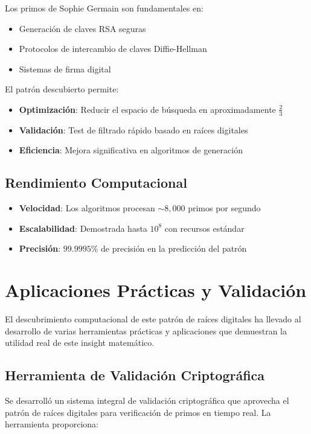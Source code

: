 \documentclass[11pt,a4paper]{article}
\theoremstyle{definition}
\theoremstyle{remark}
\begin{document}
Los primos de Sophie Germain son fundamentales en:
\begin{itemize}
    \item Generación de claves RSA seguras
    \item Protocolos de intercambio de claves Diffie-Hellman
    \item Sistemas de firma digital
\end{itemize}

El patrón descubierto permite:
\begin{itemize}
    \item \textbf{Optimización}: Reducir el espacio de búsqueda en aproximadamente $\frac{2}{3}$
    \item \textbf{Validación}: Test de filtrado rápido basado en raíces digitales
    \item \textbf{Eficiencia}: Mejora significativa en algoritmos de generación
\end{itemize}

\subsection{Rendimiento Computacional}

\begin{itemize}
    \item \textbf{Velocidad}: Los algoritmos procesan $\sim 8,000$ primos por segundo
    \item \textbf{Escalabilidad}: Demostrada hasta $10^8$ con recursos estándar
    \item \textbf{Precisión}: $99.9995\%$ de precisión en la predicción del patrón
\end{itemize}

\section{Aplicaciones Prácticas y Validación}

El descubrimiento computacional de este patrón de raíces digitales ha llevado al desarrollo de varias herramientas prácticas y aplicaciones que demuestran la utilidad real de este insight matemático.

\subsection{Herramienta de Validación Criptográfica}

Se desarrolló un sistema integral de validación criptográfica que aprovecha el patrón de raíces digitales para verificación de primos en tiempo real. La herramienta proporciona:
\end{document}
